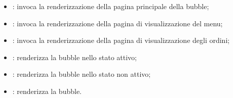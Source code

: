 \begin{itemize}
	\item {}: invoca la renderizzazione della pagina principale della bubble;
	\item {}: invoca la renderizzazione della pagina di visualizzazione del menu;
	\item {}: invoca la renderizzazione della pagina di visualizzazione degli ordini;
	\item {}: renderizza la bubble nello stato attivo;
	\item {}: renderizza la bubble nello stato non attivo;
	\item {}: renderizza la bubble.
	
\end{itemize}